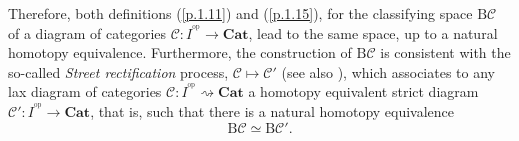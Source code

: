 \documentclass[]{amsart}
\begin{document}
 Therefore, both definitions (\ref{p.1.11}) and (\ref{p.1.15}), for the classifying space ${\ensuremath{\mathrm{B}}}{\ensuremath{\mathcal{C}}} $ of a diagram of categories ${\ensuremath{\mathcal{C}}}:I^{{^\mathrm{op}}} \to {\ensuremath{\mathbf{Cat}}}$, lead to the
same space, up to a natural homotopy equivalence. Furthermore, the construction of ${\ensuremath{\mathrm{B}}}{\ensuremath{\mathcal{C}}}$ is
consistent with the so-called {\em Street rectification} process, ${\ensuremath{\mathcal{C}}} \mapsto {\ensuremath{\mathcal{C}}}'$ \cite{street72}
(see also \cite[Theorem 3.4]{may}), which associates to any lax diagram of categories
${\ensuremath{\mathcal{C}}}:I^{^{\mathrm{op}}}\rightsquigarrow{\ensuremath{\mathbf{Cat}}}$ a homotopy equivalent strict diagram
${\ensuremath{\mathcal{C}}}':I^{^{\mathrm{op}}}\to {\ensuremath{\mathbf{Cat}}}$, that is, such that there is a natural homotopy equivalence
\cite[Lemma 3.2.5]{thomason} $$ {\ensuremath{\mathrm{B}}}{\ensuremath{\mathcal{C}}}\simeq{\ensuremath{\mathrm{B}}} {\ensuremath{\mathcal{C}}}'. $$
\end{document}
